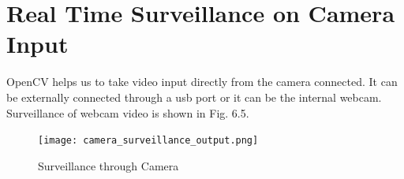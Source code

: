 \section{Real Time Surveillance on Camera Input}
OpenCV helps us to take video input directly from the camera connected. It can be externally connected through a usb port or it can be the internal webcam. Surveillance of webcam video is shown in Fig. 6.5.
\begin{figure}[H]
\centering
\texttt{[image: camera\_surveillance\_output.png]}
\caption{Surveillance through Camera}
\end{figure}

